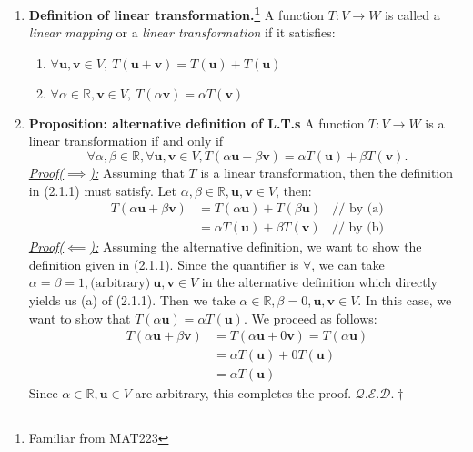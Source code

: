 \documentclass[oneside, 12pt]{book}
\newcommand{\settag}[1]{\renewcommand{\theenumi}{#1}}
\newcommand{\R}{\mathbb{R}}
\newcommand{\qed}{\hfill $\mathcal{Q}.\mathcal{E}.\mathcal{D}.\dagger$}
\newcommand{\tbf}[1]{\textbf{#1}}
\newcommand{\tit}[1]{\textit{#1}}
\begin{document}
    \begin{enumerate}
        \settag{2.1.1}
        \item \tbf{Definition of linear transformation.\footnote{Familiar from MAT223}} A function $T:V\xrightarrow{}W$ is called a
         \tit{linear mapping} or a \tit{linear transformation} if it satisfies:
        \begin{enumerate}
            \item $\forall \mathbf{u},\mathbf{v}\in V,~T(\mathbf{u} + \mathbf{v}) = T(\mathbf{u}) + T(\mathbf{u})$
            \item $\forall \alpha \in \R, \mathbf{v} \in V,~ T(\alpha\mathbf{v}) = \alpha T(\mathbf{v})$
        \end{enumerate}
        
        \settag{2.1.2}
        \item \tbf{Proposition: alternative definition of L.T.s} A function $T:V\xrightarrow{}W$ is a linear transformation if and only if 
        \begin{equation*}
            \forall \alpha,\beta \in \R, \forall \mathbf{u}, \mathbf{v} \in V, T(\alpha \mathbf{u}+\beta \mathbf{v})=\alpha T(\mathbf{u}) + \beta T(\mathbf{v}).
        \end{equation*}
        \tit{\underline{Proof($\implies$):}}\newline
        Assuming that $T$ is a linear transformation, then the definition in (2.1.1) must satisfy. Let $\alpha,\beta \in \R, \mathbf{u},\mathbf{v}\in V$, then: 
        \begin{align*}
            T(\alpha\mathbf{u} + \beta\mathbf{v}) &= T(\alpha\mathbf{u}) + T(\beta\mathbf{u})~~~~\text{// by (a)} \\
            &= \alpha T(\mathbf{u}) + \beta T(\mathbf{v})~~~~\text{// by (b)}
        \end{align*}
        \tit{\underline{Proof($\impliedby$):}}\newline
        Assuming the alternative definition, we want to show the definition given in (2.1.1). Since the quantifier is 
        $\forall$, we can take $\alpha = \beta  =1, \text{(arbitrary)}~\mathbf{u},\mathbf{v}\in V$ in the alternative
         definition which directly yields us (a) of (2.1.1). Then we take $\alpha \in \R, \beta =0, \mathbf{u}, \mathbf{v}\in V$. In this case, we want to show that $T(\alpha \mathbf{u}) = \alpha T(\mathbf{u})$. We proceed as follows: 
        \begin{align*}
            T(\alpha\mathbf{u} + \beta\mathbf{v}) &= T(\alpha\mathbf{u} + 0\mathbf{v}) = T(\alpha\mathbf{u})\\
            &= \alpha T(\mathbf{u}) + 0T(\mathbf{u}) \\
            &= \alpha T(\mathbf{u})
        \end{align*}
        Since $\alpha\in \R, \mathbf{u}\in V$ are arbitrary, this completes the proof. \qed
        

\end{enumerate}
\end{document}

